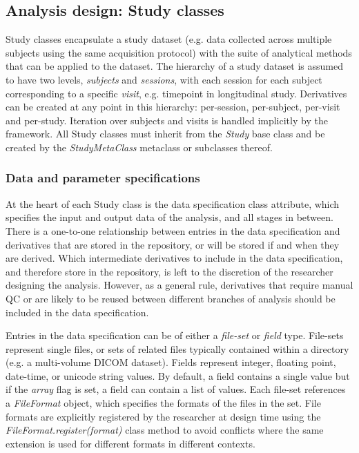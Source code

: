 \documentclass[smallextended]{svjour3}       %
\begin{document}
\subsection*{Analysis design: Study classes}
\label{analysis-design-study-classes}

Study classes encapsulate a study dataset (e.g. data collected across
multiple subjects using the same acquisition protocol) with the suite of
analytical methods that can be applied to the dataset. The hierarchy of
a study dataset is assumed to have two levels, \emph{subjects} and
\emph{sessions}, with each session for each subject corresponding to a
specific \emph{visit}, e.g. timepoint in longitudinal study. Derivatives
can be created at any point in this hierarchy: per-session, per-subject,
per-visit and per-study. Iteration over subjects and visits is handled
implicitly by the framework. All Study classes must inherit from the
\emph{Study} base class and be created by the \emph{StudyMetaClass}
metaclass or subclasses thereof.

\subsubsection*{Data and parameter specifications}
\label{sec:data-and-parameter-specifications}

At the heart of each Study class is the data specification class attribute, which
specifies the input and output data of the analysis, and all
stages in between. There is a one-to-one relationship between entries in
the data specification and derivatives that are stored in the repository,
or will be stored if and when they are derived. Which intermediate
derivatives to include in the data specification, and therefore
store in the repository, is left to the discretion of the researcher
designing the analysis. However, as a general rule, derivatives that
require manual QC or are likely to be reused between different branches
of analysis should be included in the data specification.

Entries in the data specification can be of either a
\emph{file-set} or \emph{field} type. File-sets represent single files,
or sets of related files typically contained within a directory
(e.g. a multi-volume DICOM dataset). Fields
represent integer, floating point, date-time, or unicode string
values. By default, a field contains a single value but if the \emph{array}
flag is set, a field can contain a list of values.
Each file-set references a \emph{FileFormat} object, which
specifies the formats of the files in the set. File formats are
explicitly registered by the researcher at design time using the
\emph{FileFormat.register(format)} class method to avoid conflicts where
the same extension is used for different formats in different contexts.
\end{document}
